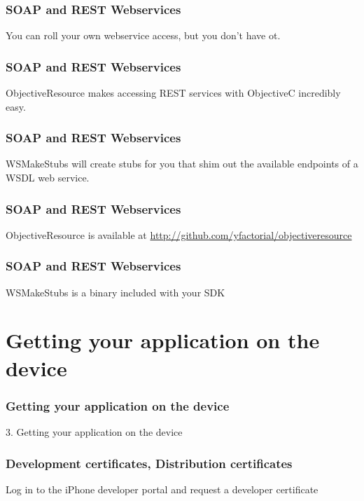 \documentclass[10pt]{beamer}
\begin{document}
    
\begin{frame}[fragile]
  \frametitle{SOAP and REST Webservices}
  You can roll your own webservice access, but you don't have ot.

\end{frame}

\begin{frame}[fragile]
  \frametitle{SOAP and REST Webservices}
  ObjectiveResource makes accessing REST services with ObjectiveC incredibly easy.

\end{frame}

\begin{frame}[fragile]
  \frametitle{SOAP and REST Webservices}
  WSMakeStubs will create stubs for you that shim out the available endpoints of a WSDL web service.

\end{frame}

\begin{frame}[fragile]
  \frametitle{SOAP and REST Webservices}
  ObjectiveResource is available at \url{http://github.com/yfactorial/objectiveresource}

\end{frame}

\begin{frame}[fragile]
  \frametitle{SOAP and REST Webservices}
  WSMakeStubs is a binary included with your SDK

\end{frame}

    

   
  

  
    
\section{Getting your application on the device}
\begin{frame}[fragile]
  \frametitle{Getting your application on the device}
  3. Getting your application on the device
\end{frame}


    
\begin{frame}[fragile]
  \frametitle{Development certificates, Distribution certificates}
  Log in to the iPhone developer portal and request a developer certificate

\end{frame}
\end{document}
